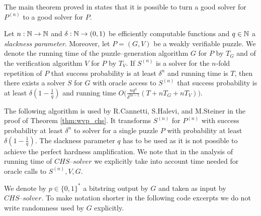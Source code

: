 The main theorem proved in \cite{canetti2004hardness} states that it is possible to turn a good solver for $P^{(n)}$ to a good solver for $P$.
%
\begin{theorem}
  \label{thm:wvp_chs}
Let $n:\mathbb{N} \rightarrow \mathbb{N}$ and $\delta: \mathbb{N} \rightarrow (0,1)$ be efficiently computable functions and $q \in \mathbb{N}$ a \textit{slackness parameter}.
Moreover, let $P = (G,V)$ be a weakly verifiable puzzle. We denote the running time of the
puzzle--generation algorithm $G$ for $P$ by $T_G$ and of the verification algorithm $V$ for $P$ by $T_V$.
If $S^{(n)}$ is a solver for the $n$-fold repetition of $P$ that success probability is at least $\delta^{n}$
and running time is $T$, then there exists a solver $S$ for $G$ with oracle access to $S^{(n)}$ that success
probability is at least $\delta(1-\frac{1}{q})$ and running time $O\Big(\frac{nq^3}{\delta^{2n-1}}(T + nT_G + nT_V)\Big)$.
\end{theorem}
%
The following algorithm is used by R.Cannetti, S.Halevi, and M.Steiner in the proof of Theorem \ref{thm:wvp_chs}.
It transforms $S^{(n)}$ for $P^{(n)}$ with success probability at least $\delta^{n}$ to solver for a single puzzle $P$ with probability
at least $\delta(1  - \frac{1}{q})$. The slackness parameter $q$ has to be used as it is not possible to achieve
the perfect hardness amplification. We note that in the analysis of running time of $\mathit{CHS\text{--}solver}$
we explicitly take into account time needed for oracle calls to $S^{(n)}, V, G$.

We denote by $p \in \{0,1\}^{*}$ a bitstring output by $G$ and taken as input by $\mathit{CHS\text{--}solver}$.
To make notation shorter in the following code excerpts we do not write randomness used by $G$ explicitly.

